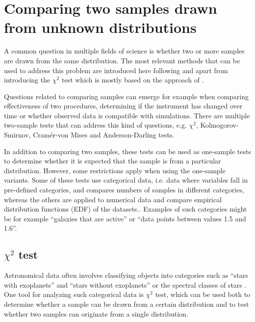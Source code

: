 \documentclass[english, oneside]{HYgradu}
\begin{document}
\section{Comparing two samples drawn from unknown distributions}
A common question in multiple fields of science is whether two or more samples are drawn from the same distribution. The most relevant methods that can be used to address this problem are introduced here following \citet{bohm2010introduction} and \citet{feigelson2012modern} apart from introducing the $\chi^2$ test which is mostly based on the approach of \citet{corder2014nonparametric}.

Questions related to comparing samples can emerge for example when comparing effectiveness of two procedures, determining if the instrument has changed over time or whether observed data is compatible with simulations. There are multiple two-sample tests that can address this kind of questions, e.g. $\chi^2$, Kolmogorov-Smirnov, Cram\'er-von Mises and Anderson-Darling tests. 

In addition to comparing two samples, these tests can be used as one-sample tests to determine whether it is expected that the sample is from a particular distribution. However, some restrictions apply when using the one-sample variants. Some of these tests use categorical data, i.e. data where variables fall in pre-defined categories, and compares numbers of samples in different categories, whereas the others are applied to numerical data and compare empirical distribution functions (EDF) of the datasets.. Examples of such categories might be for example ``galaxies that are active'' or ``data points between values 1.5 and 1.6''.


\subsection{$\chi^2$ test}
Astronomical data often involves classifying objects into categories such as ``stars with exoplanets'' and ``stars without exoplanets'' or the spectral classes of stars  \citep{feigelson2012modern}. One tool for analyzing such categorical data is $\chi^2$ test, which can be used both to determine whether a sample can be drawn from a certain distribution and to test whether two samples can originate from a single distribution. 
\end{document}
